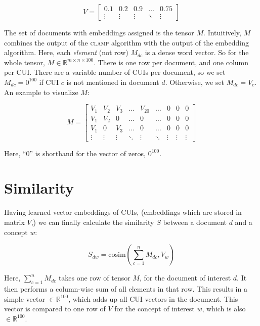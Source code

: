 \documentclass{article}
\begin{document}
\begin{equation}
  V = \left[
      \begin{array}{ccccc}
        0.1 & 0.2 & 0.9 & \ldots & 0.75 \\
        \vdots & \vdots & \vdots & \ddots & \vdots
      \end{array} \right]
\end{equation}

The set of documents with embeddings assigned is the tensor $M$.
Intuitively, $M$ combines the output of the \textsc{clamp} algorithm
with the output of the embedding algorithm. Here, each \emph{element}
(not row) $M_{dc}$ is a dense word vector. So for the whole tensor, $M
\in \mathbb{R}^{m \times n \times 100}$. There is one row per
document, and one column per CUI. There are a variable number of CUIs
per document, so we set $M_{dc} = 0^{100}$ if CUI $c$ is not mentioned
in document $d$. Otherwise, we set $M_{dc} = V_c$. An example to
visualize $M$:

\begin{equation}
  M = \left[
      \begin{array}{ccccccccc}
        V_1 & V_2 & V_3 & \ldots & V_{20} & \ldots & 0 & 0 & 0 \\
        V_1 & V_2 & 0   & \ldots & 0      & \ldots & 0 & 0 & 0 \\
        V_1 & 0   & V_3 & \ldots & 0      & \ldots & 0 & 0 & 0 \\
        \vdots & \vdots & \vdots & \ddots & \vdots & \ddots & \vdots & \vdots & \vdots
      \end{array} \right]
\end{equation}

Here, ``0'' is shorthand for the vector of zeros, $0^{100}$.

\section*{Similarity}

Having learned vector embeddings of CUIs, (embeddings which are stored
in matrix $V$,) we can finally calculate the similarity $S$ between a
document $d$ and a concept $w$:

\begin{equation}
  S_{dw} = \mathrm{cosim}(\sum_{c=1}^n M_{dc}, V_w)
\end{equation}

Here, $\sum_{c=1}^n M_{dc}$ takes one row of tensor $M$, for the
document of interest $d$. It then performs a column-wise sum of all
elements in that row. This results in a simple vector
$\in \mathbb{R}^{100}$, which adds up all CUI vectors in the document.
This vector is compared to one row of $V$ for the concept of interest $w$,
which is also $\in \mathbb{R}^{100}$.
\end{document}
